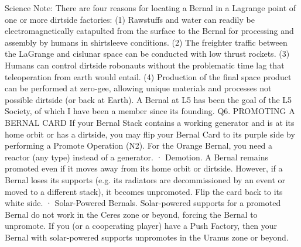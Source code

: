 \documentclass[a4paper]{book}
\begin{document}
Science Note: There are four reasons for locating a Bernal in a Lagrange point of one or more dirtside factories: (1) Rawstuffs and water can readily be electromagnetically catapulted from the surface to the Bernal for processing and assembly by humans in shirtsleeve conditions. (2) The freighter traffic between the LaGrange and cislunar space can be conducted with low thrust rockets. (3) Humans can control dirtside robonauts without the problematic time lag that teleoperation from earth would entail. (4) Production of the final space product can be performed at zero-gee, allowing unique materials and processes not possible dirtside (or back at Earth). A Bernal at L5 has been the goal of the L5 Society, of which I have been a member since its founding.
Q6. PROMOTING A BERNAL CARD
If your Bernal Stack contains a working generator and is at its home orbit or has a dirtside, you may flip your Bernal Card to its purple side by performing a Promote Operation (N2). For the Orange Bernal, you need a reactor (any type) instead of a generator.
·       Demotion. A Bernal remains promoted even if it moves away from its home orbit or dirtside. However, if a Bernal loses its supports (e.g. its radiators are decommissioned by an event or moved to a different stack), it becomes unpromoted. Flip the card back to its white side.
·   	Solar-Powered Bernals. Solar-powered supports for a promoted Bernal do not work in the Ceres zone or beyond, forcing the Bernal to unpromote. If you (or a cooperating player) have a Push Factory, then your Bernal with solar-powered supports unpromotes in the Uranus zone or beyond.
\end{document}
